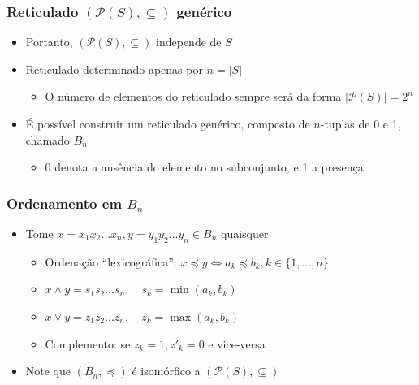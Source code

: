 \documentclass[12pt]{beamer}
\begin{document}
\begin{frame}
  \frametitle{Reticulado $(\mathcal{P}(S), \subseteq)$ genérico}
  \begin{itemize}
    \item Portanto, $(\mathcal{P}(S), \subseteq)$ independe de $S$
    \item Reticulado determinado apenas por $n = |S|$
    \begin{itemize}
      \item O número de elementos do reticulado sempre será da forma
          $|\mathcal{P}(S)| = 2^{n}$
    \end{itemize}
    \item<2-> É possível construir um reticulado genérico, composto de
        $n$-tuplas de 0 e 1, chamado $B_{n}$
    \begin{itemize}
      \item 0 denota a ausência do elemento no subconjunto, e 1 a presença
    \end{itemize}
  \end{itemize}
\end{frame}

\begin{frame}
  \frametitle{Ordenamento em $B_{n}$}
  \begin{itemize}
    \item<1-> Tome $x = x_{1} x_{2} \dots x_{n}, y = y_{1} y_{2} \dots y_{n}
        \in B_{n}$ quaisquer
    \begin{itemize}[itemsep=0pt]
      \item<2-> Ordenação ``lexicográfica'': $x \preccurlyeq y \Leftrightarrow
          a_{k} \preccurlyeq b_{k}, k \in \{1, \dots, n\}$
      \item<3-> $x \wedge y = s_{1} s_{2} \dots s_{n}, \quad s_{k} =
          \min{(a_{k}, b_{k})}$
      \item<4-> $x \vee y = z_{1} z_{2} \dots z_{n}, \quad z_{k} =
          \max{(a_{k}, b_{k})}$
      \item<5-> Complemento: se $z_{k} = 1, z'_{k} = 0$ e vice-versa
    \end{itemize}
    \item<6-> Note que $(B_{n}, \preccurlyeq)$ é isomórfico a $(\mathcal{P}(S),
        \subseteq)$
  \end{itemize}
\end{frame}
\end{document}

